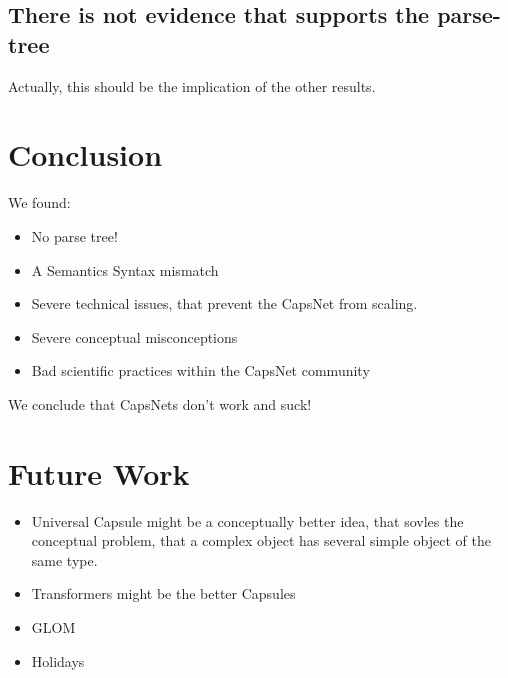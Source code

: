 \documentclass{article}
\begin{document}
\subsection{There is not evidence that supports the parse-tree}
Actually, this should be the implication of the other results.

\section{Conclusion}

We found:
\begin{itemize}
	\item No parse tree!
	\item A Semantics Syntax mismatch
	\item Severe technical issues, that prevent the CapsNet from scaling.
	\item Severe conceptual misconceptions
	\item Bad scientific practices within the CapsNet community
\end{itemize}

We conclude that CapsNets don't work and suck!

\section{Future Work}
\begin{itemize}
	\item Universal Capsule might be a conceptually better idea, that sovles the conceptual problem, that a complex object has several simple object of the same type.
	\item Transformers might be the better Capsules
	\item GLOM
	\item Holidays
\end{itemize}

%


\end{document}
